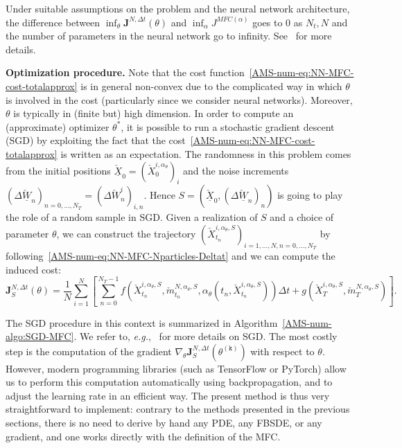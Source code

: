 \documentclass{amsproc}
\theoremstyle{definition}
\theoremstyle{remark}
\numberwithin{equation}{section}
\newcommand{\bJ}{{\mathbf J}}
\newcommand{\ctrl}{\alpha}
\begin{document}
Under suitable assumptions on the problem and the neural network architecture, the difference between $\inf_\theta\bJ^{N, \Delta t}(\theta)$ and $\inf_\ctrl J^{MFC(\ctrl)}$ goes to $0$ as $N_t, N$ and the number of parameters in the neural network go to infinity. See~\cite{carmona2019convergence2} for more details. 


\textbf{Optimization procedure. } Note that the cost function~\eqref{AMS-num-eq:NN-MFC-cost-totalapprox} is in general non-convex due to the complicated way in which $\theta$ is involved in the cost (particularly since we consider neural networks). Moreover, $\theta$ is typically in (finite but) high dimension. In order to compute an (approximate) optimizer $\theta^*$, it is possible to run a stochastic gradient descent (SGD) by exploiting the fact that the cost~\eqref{AMS-num-eq:NN-MFC-cost-totalapprox} is written as an expectation. The randomness in this problem comes from the initial positions $\underline {\check X}_0 = (\check X_0^{i, \ctrl_\theta})_{i}$ and the noise increments $(\Delta \underline {\check W}_n)_{n=0,\dots,N_T} = (\Delta \check W_n^i)_{i,n}$. Hence $S = (\underline {\check X}_0, (\Delta \underline {\check W}_n)_{n})$ is going to play the role of a random sample in SGD. Given  a realization of $S$ and a choice of parameter $\theta$, we can construct the trajectory $(\check X_{t_n}^{i, \ctrl_\theta,S})_{i=1,\dots,N, n=0,\dots,N_T}$ by following~\eqref{AMS-num-eq:NN-MFC-Nparticles-Deltat} and we can compute the induced cost:
\begin{equation}
\label{AMS-num-eq:NN-MFC-cost-totalapprox-oneS}
	\bJ^{N, \Delta t}_S(\theta) = \frac{1}{N} \sum_{i=1}^N \left[\sum_{n=0}^{N_T-1} f(\check X_{t_n}^{i, \ctrl_\theta, S}, \check m^{N, \ctrl_\theta, S}_{t_n}, \ctrl_\theta(t_n,\check X_{t_n}^{i, \ctrl_\theta, S}) ) \Delta t + g(\check X_T^{i, \ctrl_\theta, S}, \check m^{N,\ctrl_\theta, S}_T) \right].
\end{equation}

The SGD procedure in this context is summarized in Algorithm~\ref{AMS-num-algo:SGD-MFC}. We refer to, \textit{e.g.},~\cite{MR3797719} for more details on SGD. The most costly step is the computation of the gradient $\nabla_\theta \bJ^{N, \Delta t}_S(\theta^{(\mathtt{k})})$  with respect to $\theta$. However, modern programming libraries (such as TensorFlow or PyTorch) allow us to perform this computation automatically using backpropagation, and to adjust the learning rate in an efficient way. The present method is thus very straightforward to implement: contrary to the methods presented in the previous sections, there is no need to derive by hand any PDE, any FBSDE, or any gradient, and one works directly with the definition of the MFC.
\end{document}
